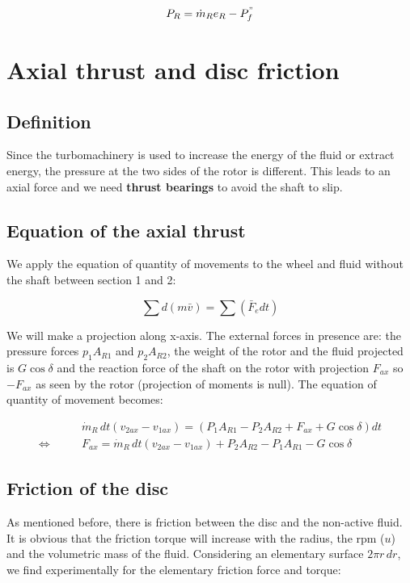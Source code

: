 \begin{equation}
P_R = \dot{m}_R e_R - P^"_f
\end{equation}


\section{Axial thrust and disc friction}
\subsection{Definition}
Since the turbomachinery is used to increase the energy of the fluid or extract energy, the pressure at the two sides of the rotor is different. This leads to an axial force and we need \textbf{thrust bearings} to avoid the shaft to slip. 

\subsection{Equation of the axial thrust}
We apply the equation of quantity of movements to the wheel and fluid without the shaft between section 1 and 2: 

\begin{equation}
\sum d(m\bar{v}) = \sum (\bar{F}_e dt)
\end{equation}

We will make a projection along x-axis. The external forces in presence are: the pressure forces $p_1A_{R1}$ and $p_2A_{R2}$, the weight of the rotor and the fluid projected is $G\cos \delta$ and the reaction force of the shaft on the rotor with projection $F_{ax}$ so $-F_{ax}$ as seen by the rotor (projection of moments is null). The equation of quantity of movement becomes: 

\begin{equation}
\begin{aligned}
&\dot{m}_R\, dt (v_{2ax} - v_{1ax}) = (P_1 A_{R1} - P_2 A_{R2} + F_{ax} + G\cos \delta ) dt\\
\Leftrightarrow\qquad &F_{ax} = \dot{m}_R\, dt (v_{2ax} - v_{1ax}) + P_2 A_{R2} - P_1 A_{R1} -  G\cos \delta
\end{aligned}
\end{equation}

\subsection{Friction of the disc}
As mentioned before, there is friction between the disc and the non-active fluid. It is obvious that the friction torque will increase with the radius, the rpm ($u$) and the volumetric mass of the fluid. Considering an elementary surface $2\pi r\, dr$, we find experimentally for the elementary friction force and torque: 

